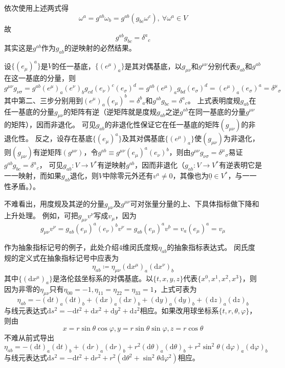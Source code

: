 依次使用上述两式得
$$\omega^a = g^{ab}\omega_b = g^{ab}(g_{bc}\omega^c), ~ \forall \omega^a \in V$$
故
$$g^{ab}g_{bc} = \delta^a{}_c$$
其实这是$g^{ab}$作为$g_{ab}$的逆映射的必然结果。

设$\{(e_\mu)^a\}$是$V$的任一基底，$\{(e^\mu)_a\}$是其对偶基底，以$g_{\mu\nu}$和$g^{\mu\nu}$分别代表$g_{ab}$和$g^{ab}$在这一基底的分量，则
$$g^{\mu\nu}g_{\nu\sigma} = g^{ab}(e^\mu)_a(e^\nu)_bg_{cd}(e_\nu)^c(e_\sigma)^d = g^{ab}(e^\mu)_ag_{bd}(e_\sigma)^d = (e^\mu)_a(e_\sigma)^a = \delta^\mu{}_\sigma$$
其中第二、三步分别用到$(e^\mu)_a(e_\mu)^b = \delta^b{}_a$和$g^{ab}g_{bc} = \delta^a{}_c$。
上式表明度规$g_{ab}$在任一基底的分量$g_{\mu\nu}$的矩阵有逆（逆矩阵就是度规$g_{ab}$之逆$g^{ab}$在同一基底的分量$g^{\mu\nu}$的矩阵），因而非退化。
可见$g_{ab}$的非退化性保证它在任一基底的矩阵$(g_{\mu\nu})$的非退化性。
反之，设存在基底$\{(e_\mu)^a\}$及其对偶基底$\{(e^\mu)_a\}$使$(g_{\mu\nu})$为非退化，则$(g_{\mu\nu})$有逆矩阵$(g^{\mu\nu})$，令$g^{ab} \equiv g^{\mu\nu}(e_\mu)^a(e_\nu)^b$，则由$g^{\mu\nu}g_{\nu\sigma} = \delta^\mu{}_\sigma$易证$g^{ab}g_{bc} = \delta^a{}_c$，
可见$g_{ab} \colon V \to V^*$有逆映射$g^{ab}$，因而非退化（$g_{ab} \colon V \to V^*$有逆表明它是一一映射，而如果$g_{ab}$退化，则$V$中除零元外还有$v^a \neq 0$，其像也为$\underline{0} \in V^*$，与一一性矛盾。）。

不难看出，用度规及其逆的分量$g_{\mu\nu}$及$g^{\mu\nu}$可对张量分量的上、下具体指标做下降和上升处理。
例如，可把$g_{\mu\nu}v^\nu$写成$v_\mu$，因为
$$g_{\mu\nu}v^\nu = g_{ab}(e_\mu)^a(e_\nu)^bv^\nu = g_{ab}(e_\mu)^av^b = v_a(e_\mu)^a = v_\mu$$

作为抽象指标记号的例子，此处介绍$4$维闵氏度规$\eta_{ab}$的抽象指标表达式。
闵氏度规的定义式在抽象指标记号中应表为
$$\eta_{ab} \coloneq \eta_{\mu\nu}(\mathrm{d}x^\mu)_a(\mathrm{d}x^\nu)_b$$
其中$\{(\mathrm{d}x^\mu)_a\}$是洛伦兹坐标系的对偶基底。以$\{t, x, y, z\}$代表$\{x^0, x^1, x^2, x^3\}$，则因为非零的$\eta_{\mu\nu}$只有$\eta_{00} = -1, \eta_{11} = \eta_{22} = \eta_{33} = 1$，上式可表为
$$\eta_{ab} = -(\mathrm{d}t)_a(\mathrm{d}t)_b + (\mathrm{d}x)_a(\mathrm{d}x)_b + (\mathrm{d}y)_a(\mathrm{d}y)_b + (\mathrm{d}z)_a(\mathrm{d}z)_b$$
与线元表达式$\mathrm{d}s^2 = -\mathrm{d}t^2 + \mathrm{d}x^2 + \mathrm{d}y^2 + \mathrm{d}z^2$相应。如果改用球坐标系$\{t, r, \theta, \varphi\}$，则由
$$x = r\sin\theta\cos\varphi, y = r\sin\theta\sin\varphi, z = r\cos\theta$$
不难从前式导出
$$\eta_{ab} = -(\mathrm{d}t)_a(\mathrm{d}t)_b + (\mathrm{d}r)_a(\mathrm{d}r)_b + r^2(\mathrm{d}\theta)_a(\mathrm{d}\theta)_b + r^2\sin^2\theta(\mathrm{d}\varphi)_a(\mathrm{d}\varphi)_b$$
与线元表达式$\mathrm{d}s^2 = -\mathrm{d}t^2 + \mathrm{d}r^2 + r^2(\mathrm{d}\theta^2 + \sin^2\theta\mathrm{d}\varphi^2)$相应。


